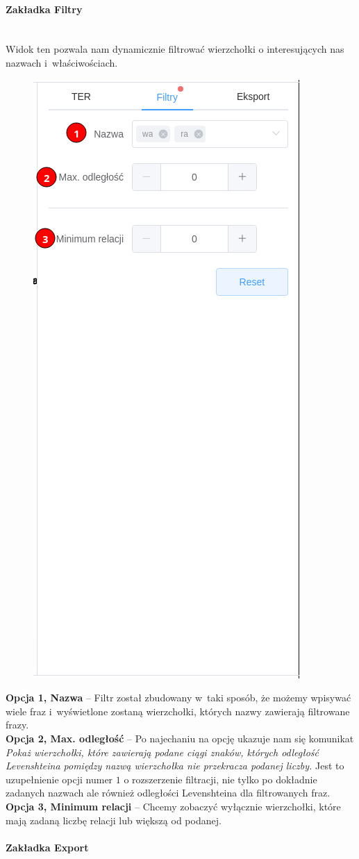 \documentclass[12pt, a4paper]{article}
\newcommand{\subsubsubsection}[1]{\paragraph{#1}\mbox{}\\}
\begin{document}
\subsubsubsection{Zakładka Filtry}

Widok ten pozwala nam dynamicznie filtrować wierzchołki o interesujących nas nazwach i~właściwościach.

\begin{figure}[H]
  \centering
  \includegraphics[width=0.4\linewidth, trim={0 14cm 0.2cm 0},clip]{images/graph-filters.png}
\end{figure}

\noindent \textbf{Opcja 1, Nazwa} --  Filtr został zbudowany w~taki sposób, że możemy wpisywać wiele fraz i~wyświetlone zostaną wierzchołki, których nazwy zawierają filtrowane frazy.\\

\noindent \textbf{Opcja 2, Max. odległość} -- Po najechaniu na opcję ukazuje nam się komunikat \textit{Pokaż wierzchołki, które zawierają podane ciągi znaków, których odległość Levenshteina pomiędzy nazwą wierzchołka nie przekracza podanej liczby.} Jest to uzupełnienie opcji numer $1$ o rozszerzenie filtracji, nie tylko po dokładnie zadanych nazwach ale również odległości Levenshteina dla filtrowanych fraz.\\

\noindent \textbf{Opcja 3, Minimum relacji} -- Chcemy zobaczyć wyłącznie wierzchołki, które mają zadaną liczbę relacji lub większą od podanej.

\subsubsubsection{Zakładka Export}
\end{document}
